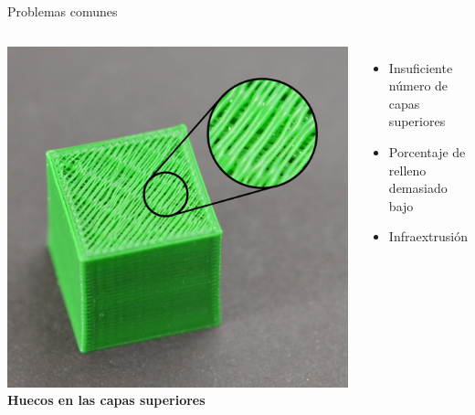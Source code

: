 \documentclass{beamer}
\begin{document}
	\begin{frame}{Problemas comunes}
		\begin{columns}
				\includegraphics[width=\textwidth]{images/Holes-Or-Gaps-In-Top-Layers}
				\textbf{Huecos en las capas superiores}
				\begin{itemize}
					\item Insuficiente número de capas superiores
					\item Porcentaje de relleno demasiado bajo
					\item Infraextrusión
				\end{itemize}
		\end{columns}
	\end{frame}
\end{document}
